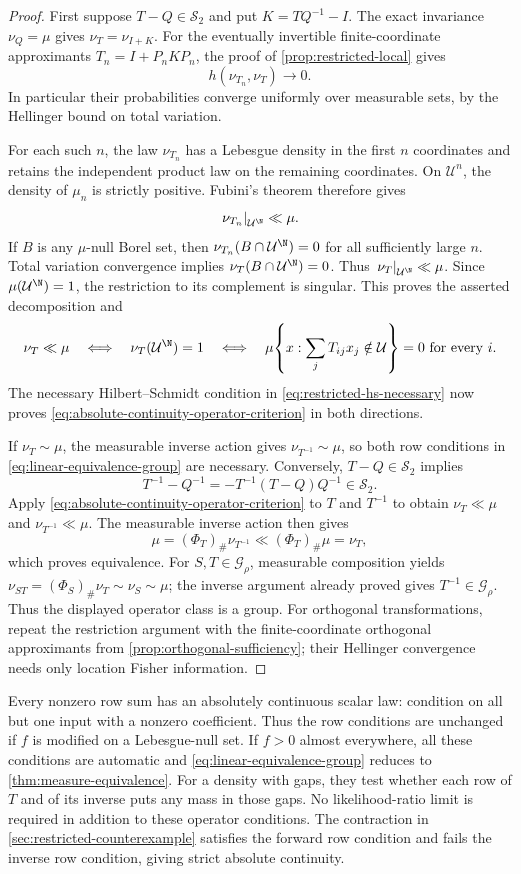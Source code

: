 \begin{proof}
First suppose $T-Q\in\mathcal S_2$ and put $K=TQ^{-1}-I$.
The exact invariance $\nu_Q=\mu$ gives $\nu_T=\nu_{I+K}$.
For the eventually invertible finite-coordinate approximants
$T_n=I+P_nKP_n$, the proof of \cref{prop:restricted-local} gives
\[
 h(\nu_{T_n},\nu_T)\longrightarrow0.
\]
In particular their probabilities converge uniformly over measurable
sets, by the Hellinger bound on total variation.

For each such $n$, the law $\nu_{T_n}$ has a Lebesgue density in the
first $n$ coordinates and retains the independent product law on the
remaining coordinates.  On $\mathcal U^n$, the density of $\mu_n$ is
strictly positive.  Fubini's theorem therefore gives
\[
 \left.\nu_{T_n}\right|_{\mathcal U^{\N}}\ll\mu.
\]
If $B$ is any $\mu$-null Borel set, then
$\nu_{T_n}(B\cap\mathcal U^{\N})=0$ for all sufficiently large $n$.
Total variation convergence implies
$\nu_T(B\cap\mathcal U^{\N})=0$.
Thus $\left.\nu_T\right|_{\mathcal U^{\N}}\ll\mu$.
Since $\mu(\mathcal U^{\N})=1$, the restriction to its complement is
singular.  This proves the asserted decomposition and
\[
 \nu_T\ll\mu
 \quad\Longleftrightarrow\quad
 \nu_T(\mathcal U^{\N})=1
 \quad\Longleftrightarrow\quad
 \mu\!\left\{x:\sum_jT_{ij}x_j\notin\mathcal U\right\}=0
       \text{ for every }i.
\]
The necessary Hilbert--Schmidt condition in
\eqref{eq:restricted-hs-necessary} now proves
\eqref{eq:absolute-continuity-operator-criterion} in both directions.

If $\nu_T\sim\mu$, the measurable inverse action gives
$\nu_{T^{-1}}\sim\mu$, so both row conditions in
\eqref{eq:linear-equivalence-group} are necessary.
Conversely, $T-Q\in\mathcal S_2$ implies
\[
 T^{-1}-Q^{-1}=-T^{-1}(T-Q)Q^{-1}\in\mathcal S_2.
\]
Apply \eqref{eq:absolute-continuity-operator-criterion} to $T$ and
$T^{-1}$ to obtain $\nu_T\ll\mu$ and $\nu_{T^{-1}}\ll\mu$.
The measurable inverse action then gives
\[
 \mu=(\Phi_T)_\#\nu_{T^{-1}}\ll(\Phi_T)_\#\mu=\nu_T,
\]
which proves equivalence.
For $S,T\in\mathcal G_\rho$, measurable composition yields
$\nu_{ST}=(\Phi_S)_\#\nu_T\sim\nu_S\sim\mu$; the inverse argument
already proved gives $T^{-1}\in\mathcal G_\rho$.
Thus the displayed operator class is a group.
For orthogonal transformations, repeat the restriction argument with
the finite-coordinate orthogonal approximants from
\cref{prop:orthogonal-sufficiency}; their Hellinger convergence needs
only location Fisher information.
\end{proof}

Every nonzero row sum has an absolutely continuous scalar law: condition
on all but one input with a nonzero coefficient.  Thus the row conditions
are unchanged if $f$ is modified on a Lebesgue-null set.
If $f>0$ almost everywhere, all these conditions are automatic and
\eqref{eq:linear-equivalence-group} reduces to
\cref{thm:measure-equivalence}.
For a density with gaps, they test whether each row of $T$ and of its
inverse puts any mass in those gaps.  No likelihood-ratio limit is
required in addition to these operator conditions.  The contraction in
\cref{sec:restricted-counterexample} satisfies the forward row condition
and fails the inverse row condition, giving strict absolute continuity.

